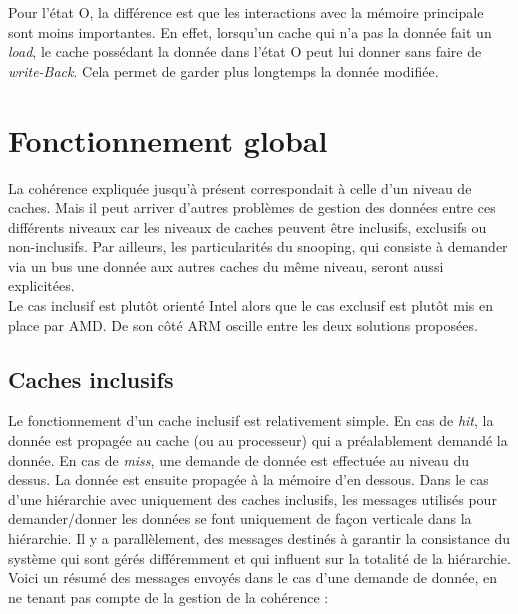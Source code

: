 Pour l'état O, la différence est que les interactions avec la mémoire principale sont moins importantes. En effet, lorsqu'un cache qui n'a pas la donnée fait un \textit{load}, le cache possédant la donnée dans l'état O peut lui donner sans faire de \textit{write-Back}. Cela permet de garder plus longtemps la donnée modifiée.

\section{Fonctionnement global}
La cohérence expliquée jusqu'à présent correspondait à celle d'un niveau de caches. Mais il peut arriver d'autres problèmes de gestion des données entre ces différents niveaux car les niveaux de caches peuvent être inclusifs, exclusifs ou non-inclusifs. Par ailleurs, les particularités du snooping, qui consiste à demander via un bus une donnée aux autres caches du même niveau, seront aussi explicitées. \\

Le cas inclusif est plutôt orienté \textsf{Intel} alors que le cas exclusif est plutôt mis en place par \textsf{AMD}. De son côté \textsf{ARM} oscille entre les deux solutions proposées.

\label{inclusivite}
\subsection{Caches inclusifs}
Le fonctionnement d'un cache inclusif est relativement simple. En cas de \textit{hit}, la donnée est propagée au cache (ou au processeur) qui a préalablement demandé la donnée. En cas de \textit{miss}, une demande de donnée est effectuée au niveau du dessus. La donnée est ensuite propagée à la mémoire d'en dessous. Dans le cas d'une hiérarchie avec uniquement des caches inclusifs, les messages utilisés pour demander/donner les données se font uniquement de façon verticale dans la hiérarchie. Il y a parallèlement, des messages destinés à garantir la consistance du système qui sont gérés différemment et qui influent sur la totalité de la hiérarchie. Voici un résumé des messages envoyés dans le cas d'une demande de donnée, en ne tenant pas compte de la gestion de la cohérence : \\

